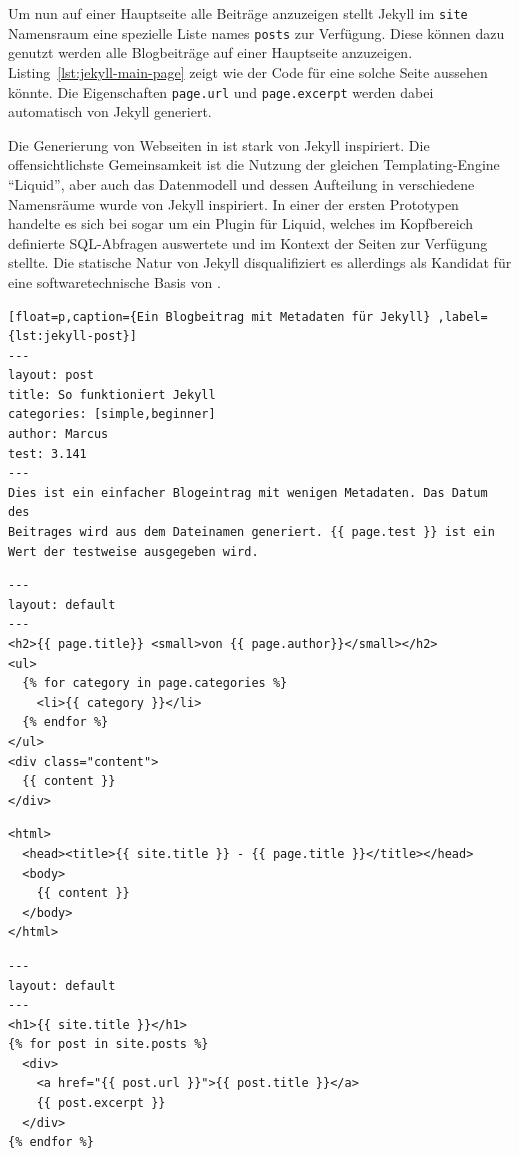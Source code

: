 Um nun auf einer Hauptseite alle Beiträge anzuzeigen stellt Jekyll im \lstinline{site} Namensraum eine spezielle Liste names \lstinline{posts} zur Verfügung. Diese können dazu genutzt werden alle Blogbeiträge auf einer Hauptseite anzuzeigen. Listing~\ref{lst:jekyll-main-page} zeigt wie der Code für eine solche Seite aussehen könnte. Die Eigenschaften \lstinline|page.url| und \lstinline|page.excerpt| werden dabei automatisch von Jekyll generiert.

Die Generierung von Webseiten in \idename ist stark von Jekyll inspiriert. Die offensichtlichste Gemeinsamkeit ist die Nutzung der gleichen Templating-Engine "`Liquid"', aber auch das Datenmodell und dessen Aufteilung in verschiedene Namensräume wurde von Jekyll inspiriert. In einer der ersten Prototypen handelte es sich bei \idename sogar um ein Plugin für Liquid, welches im Kopfbereich definierte SQL-Abfragen auswertete und im Kontext der Seiten zur Verfügung stellte. Die statische Natur von Jekyll disqualifiziert es allerdings als Kandidat für eine softwaretechnische Basis von \idename.

\begin{lstlisting}[float=p,caption={Ein Blogbeitrag mit Metadaten für Jekyll} ,label={lst:jekyll-post}]
---
layout: post
title: So funktioniert Jekyll
categories: [simple,beginner]
author: Marcus
test: 3.141
---
Dies ist ein einfacher Blogeintrag mit wenigen Metadaten. Das Datum des
Beitrages wird aus dem Dateinamen generiert. {{ page.test }} ist ein
Wert der testweise ausgegeben wird.
\end{lstlisting}

\begin{lstlisting}[float=p,caption={Beispieltemplate für Blogbeiträge für Jekyll}, label={lst:jekyll-post-template}]
---
layout: default
---
<h2>{{ page.title}} <small>von {{ page.author}}</small></h2>
<ul>
  {% for category in page.categories %}
    <li>{{ category }}</li>
  {% endfor %}
</ul>
<div class="content">
  {{ content }}
</div>
\end{lstlisting}

\begin{lstlisting}[float=p,caption={Template mit HTML-Rumpf für Jekyll}, label={lst:jekyll-master-template}]
<html>
  <head><title>{{ site.title }} - {{ page.title }}</title></head>
  <body>
    {{ content }}
  </body>
</html>
\end{lstlisting}

\begin{lstlisting}[float=p,caption={Hauptseite mit Auszügen aller Beiträge für Jekyll}, label={lst:jekyll-main-page}]
---
layout: default
---
<h1>{{ site.title }}</h1>
{% for post in site.posts %}
  <div>
    <a href="{{ post.url }}">{{ post.title }}</a>
    {{ post.excerpt }}
  </div>
{% endfor %}
\end{lstlisting}

